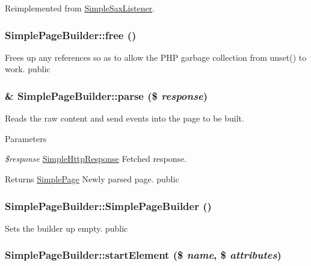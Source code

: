 Reimplemented from \hyperlink{class_simple_sax_listener_abfa321e2d3edcf3f00b585c8b26e46cb}{SimpleSaxListener}.\hypertarget{class_simple_page_builder_ae4ebd7ba464976aeea6445eec30253e5}{
\subsubsection[{free}]{\setlength{\rightskip}{0pt plus 5cm}SimplePageBuilder::free ()}}
\label{class_simple_page_builder_ae4ebd7ba464976aeea6445eec30253e5}
Frees up any references so as to allow the PHP garbage collection from unset() to work.  public \hypertarget{class_simple_page_builder_a9e5064b871d06f5b601184d7c3ca1567}{
\subsubsection[{parse}]{\setlength{\rightskip}{0pt plus 5cm}\& SimplePageBuilder::parse (\$ {\em response})}}
\label{class_simple_page_builder_a9e5064b871d06f5b601184d7c3ca1567}
Reads the raw content and send events into the page to be built. 
\begin{DoxyParams}{Parameters}
\item[{\em \$response}]\hyperlink{class_simple_http_response}{SimpleHttpResponse} Fetched response. \end{DoxyParams}
\begin{DoxyReturn}{Returns}
\hyperlink{class_simple_page}{SimplePage} Newly parsed page.  public 
\end{DoxyReturn}
\hypertarget{class_simple_page_builder_aa78adff50b24bb29981c9c655905b10c}{
\subsubsection[{SimplePageBuilder}]{\setlength{\rightskip}{0pt plus 5cm}SimplePageBuilder::SimplePageBuilder ()}}
\label{class_simple_page_builder_aa78adff50b24bb29981c9c655905b10c}
Sets the builder up empty.  public \hypertarget{class_simple_page_builder_a7b40a556918f88bd570eed376ad36b7e}{
\subsubsection[{startElement}]{\setlength{\rightskip}{0pt plus 5cm}SimplePageBuilder::startElement (\$ {\em name}, \/  \$ {\em attributes})}}

